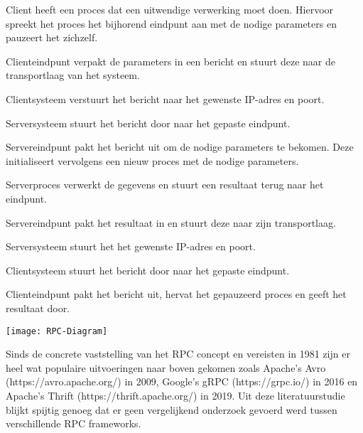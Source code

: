 \begin{steps}
    \item Client heeft een proces dat een uitwendige verwerking moet doen. Hiervoor spreekt het proces het bijhorend eindpunt aan met de nodige parameters en pauzeert het zichzelf.
    \item Clienteindpunt verpakt de parameters in een bericht en stuurt deze naar de transportlaag van het systeem.
    \item Clientsysteem verstuurt het bericht naar het gewenste IP-adres en poort.
    \item Serversysteem stuurt het bericht door naar het gepaste eindpunt.
    \item Servereindpunt pakt het bericht uit om de nodige parameters te bekomen. Deze initialiseert vervolgens een nieuw proces met de nodige parameters.
    \item Serverproces verwerkt de gegevens en stuurt een resultaat terug naar het eindpunt.
    \item Servereindpunt pakt het resultaat in en stuurt deze naar zijn transportlaag.
    \item Serversysteem stuurt het  het gewenste IP-adres en poort.
    \item Clientsysteem stuurt het bericht door naar het gepaste eindpunt.
    \item Clienteindpunt pakt het bericht uit, hervat het gepauzeerd proces en geeft het resultaat door.
\end{steps}
\begin{center}
    \texttt{[image: RPC-Diagram]}
\end{center}
Sinds de concrete vaststelling van het RPC concept en vereisten in 1981 zijn er heel wat populaire uitvoeringen naar boven gekomen zoals  Apache's Avro (https://avro.apache.org/) in 2009, Google's gRPC (https://grpc.io/) in 2016 en Apache's Thrift (https://thrift.apache.org/) in 2019. Uit deze literatuurstudie blijkt spijtig genoeg dat er geen vergelijkend onderzoek gevoerd werd tussen verschillende RPC frameworks.
